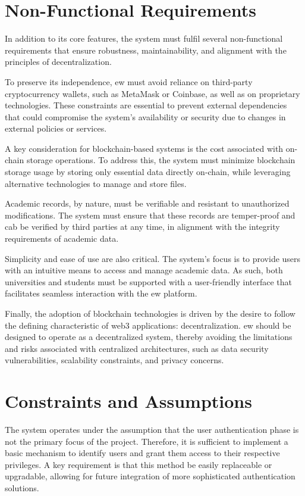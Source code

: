 \section{Non-Functional Requirements}
\label{sec:nonFunctionalRequirements}
In addition to its core features, the system must fulfil several non-functional requirements that ensure robustness, maintainability, and alignment with the principles of decentralization. 

To preserve its independence, \acrshort{ew} must avoid reliance on third-party cryptocurrency wallets, such as MetaMask or Coinbase, as well as on proprietary technologies. These constraints are essential to prevent external dependencies that could compromise the system’s availability or security due to changes in external policies or services.

A key consideration for blockchain-based systems is the cost associated with on-chain storage operations. To address this, the system must minimize blockchain storage usage by storing only essential data directly on-chain, while leveraging alternative technologies to manage and store files.

Academic records, by nature, must be verifiable and resistant to unauthorized modifications. The system must ensure that these records are temper-proof and cab be verified by third parties at any time, in alignment with the integrity requirements of academic data.

Simplicity and ease of use are also critical. The system's focus is to provide users with an intuitive means to access and manage academic data. As such, both universities and students must be supported with a user-friendly interface that facilitates seamless interaction with the \acrshort{ew} platform.

Finally, the adoption of blockchain technologies is driven by the desire to follow the defining characteristic of \Gls{web3} applications: decentralization. \acrshort{ew} should be designed to operate as a decentralized system, thereby avoiding the limitations and risks associated with centralized architectures, such as data security vulnerabilities, scalability constraints, and privacy concerns.

\section{Constraints and Assumptions}
The system operates under the assumption that the user authentication phase is not the primary focus of the project. Therefore, it is sufficient to implement a basic mechanism to identify users and grant them access to their respective privileges. A key requirement is that this method be easily replaceable or upgradable, allowing for future integration of more sophisticated authentication solutions.

